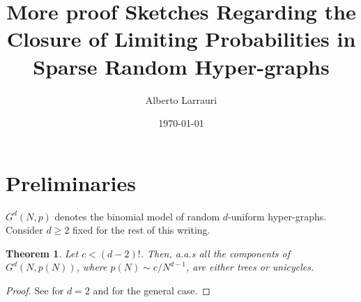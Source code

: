 \documentclass[11pt,notitlepage,a4paper]{article}
\title{More proof Sketches Regarding the Closure of 
	Limiting Probabilities in Sparse Random Hyper-graphs}
\date{\today}
\author{Alberto Larrauri}
\newtheorem{theorem}{Theorem}[section]
\theoremstyle{definition}
\begin{document}
	\maketitle 
\section{Preliminaries}
$G^d(N,p)$ denotes the binomial model of random $d$-uniform hyper-graphs. 
Consider $d\geq 2$ fixed for the rest of this writing. 

\begin{theorem} Let $c<(d-2)!$. Then, a.a.s all the components
of $G^d(N,p(N))$, where $p(N)\sim c/N^{d-1}$, are either trees or unicycles.
\end{theorem}
\begin{proof} See \cite{erdHos1960evolution} for $d=2$ and
	\cite{karonski2002phase} for the general case.
\end{proof}
\end{document}
